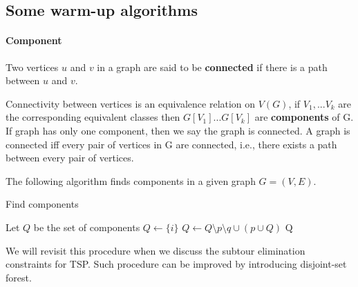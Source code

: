         \subsection{Some warm-up algorithms}
            \paragraph{Component}
                \begin{definition}
                    Two vertices $u$ and $v$ in a graph are said to be \textbf{connected} if there is a path between $u$ and $v$.
                \end{definition}

                \begin{definition}[component]
                    Connectivity between vertices is an equivalence relation on $V(G)$, if $V_1, ... V_k$ are the corresponding equivalent classes then $G[V_1]...G[V_k]$ are \textbf{components} of G. If graph has only one component, then we say the graph is connected. A graph is connected iff every pair of vertices in G are connected, i.e., there exists a path between every pair of vertices.
                \end{definition}

                The following algorithm finds components in a given graph $G = (V, E)$.

                \begin{algorithm}[H]
                    \centering
                    \caption{Find components}
                    \begin{algorithmic}[1]
                        \State Let $Q$ be the set of components
                            \State $Q \gets \{i\}$
                        \EndFor
                                        \State $Q \gets Q \setminus p \setminus q \cup (p \cup Q)$
                                    \EndIf
                                \EndFor
                            \EndFor
                        \EndFor
                        \State \Return Q
                    \end{algorithmic}
                \end{algorithm}

                We will revisit this procedure when we discuss the subtour elimination constraints for TSP. Such procedure can be improved by introducing disjoint-set forest.


